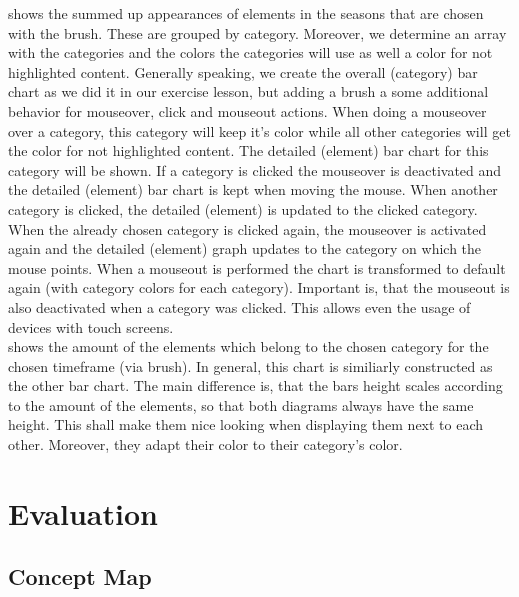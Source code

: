 \documentclass[a4paper]{tufte-book}
\begin{document}
 shows the summed up appearances of elements in the seasons that are chosen with the brush. These are grouped by category. Moreover, we determine an array with the categories and the colors the categories will use as well a color for not highlighted content. Generally speaking, we create the overall (category) bar chart as we did it in our exercise lesson, but adding a brush a some additional behavior for mouseover, click and mouseout actions. When doing a mouseover over a category, this category will keep it's color while all other categories will get the color for not highlighted content. The detailed (element) bar chart for this category will be shown.
If a category is clicked the mouseover is deactivated and the detailed (element) bar chart is kept when moving the mouse. When another category is clicked, the detailed (element) is updated to the clicked category. When the already chosen category is clicked again, the mouseover is activated again and the detailed (element) graph updates to the category on which the mouse points. When a mouseout is performed the chart is transformed to default again (with category colors for each category). Important is, that the mouseout is also deactivated when a category was clicked. This allows even the usage of devices with touch screens. \\

 shows the amount of the elements which belong to the chosen category for the chosen timeframe (via brush). In general, this chart is similiarly constructed as the other bar chart. The main difference is, that the bars height scales according to the amount of the elements, so that both diagrams always have the same height. This shall make them nice looking when displaying them next to each other. Moreover, they adapt their color to their category's color. \\

\chapter{Evaluation}
\section{Concept Map}
\end{document}
